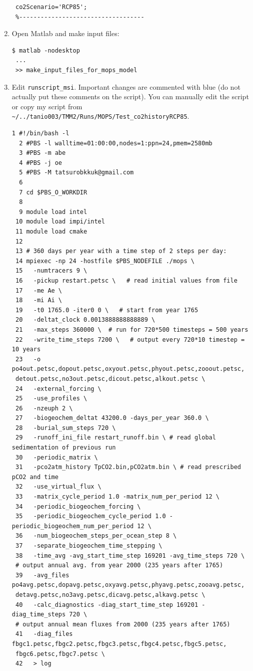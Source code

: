 \documentclass[a4paper]{article}
\begin{document}
\begin{enumerate}
\begin{lstlisting}[frame=single,basicstyle=\scriptsize,commentstyle=\color{blue}]
 % Available options: 'historical', 'RCP3PD', 'RCP45', 'RCP6' and 'RCP85'
 co2Scenario='RCP85';
 %-----------------------------------
\end{lstlisting}

\item Open Matlab and make input files:
\begin{lstlisting}[style=DOS]
 $ matlab -nodesktop
 ...
 >> make_input_files_for_mops_model
\end{lstlisting}

\item Edit \verb|runscript_msi|. Important changes are commented with blue (do not actually put these comments on the script). You can manually edit the script or copy my script from \\ \verb|~/../tanio003/TMM2/Runs/MOPS/Test_co2historyRCP85|.
\lstset{language=sh} 
\begin{lstlisting}[frame=single,basicstyle=\scriptsize,commentstyle=\color{blue}]
  1 #!/bin/bash -l
  2 #PBS -l walltime=01:00:00,nodes=1:ppn=24,pmem=2580mb
  3 #PBS -m abe
  4 #PBS -j oe
  5 #PBS -M tatsurobkkuk@gmail.com
  6
  7 cd $PBS_O_WORKDIR
  8
  9 module load intel
 10 module load impi/intel
 11 module load cmake
 12
 13 # 360 days per year with a time step of 2 steps per day:
 14 mpiexec -np 24 -hostfile $PBS_NODEFILE ./mops \
 15   -numtracers 9 \
 16   -pickup restart.petsc \   # read initial values from file
 17   -me Ae \
 18   -mi Ai \
 19   -t0 1765.0 -iter0 0 \   # start from year 1765
 20   -deltat_clock 0.0013888888888889 \   
 21   -max_steps 360000 \  # run for 720*500 timesteps = 500 years
 22   -write_time_steps 7200 \   # output every 720*10 timestep = 10 years
 23   -o po4out.petsc,dopout.petsc,oxyout.petsc,phyout.petsc,zooout.petsc,
 detout.petsc,no3out.petsc,dicout.petsc,alkout.petsc \
 24   -external_forcing \
 25   -use_profiles \
 26   -nzeuph 2 \
 27   -biogeochem_deltat 43200.0 -days_per_year 360.0 \
 28   -burial_sum_steps 720 \
 29   -runoff_ini_file restart_runoff.bin \ # read global sedimentation of previous run
 30   -periodic_matrix \
 31   -pco2atm_history TpCO2.bin,pCO2atm.bin \ # read prescribed pCO2 and time
 32   -use_virtual_flux \
 33   -matrix_cycle_period 1.0 -matrix_num_per_period 12 \
 34   -periodic_biogeochem_forcing \
 35   -periodic_biogeochem_cycle_period 1.0 -periodic_biogeochem_num_per_period 12 \
 36   -num_biogeochem_steps_per_ocean_step 8 \
 37   -separate_biogeochem_time_stepping \
 38   -time_avg -avg_start_time_step 169201 -avg_time_steps 720 \ 
 # output annual avg. from year 2000 (235 years after 1765)
 39   -avg_files po4avg.petsc,dopavg.petsc,oxyavg.petsc,phyavg.petsc,zooavg.petsc,
 detavg.petsc,no3avg.petsc,dicavg.petsc,alkavg.petsc \
 40   -calc_diagnostics -diag_start_time_step 169201 -diag_time_steps 720 \ 
 # output annual mean fluxes from 2000 (235 years after 1765)
 41   -diag_files fbgc1.petsc,fbgc2.petsc,fbgc3.petsc,fbgc4.petsc,fbgc5.petsc,
 fbgc6.petsc,fbgc7.petsc \
 42   > log
\end{lstlisting}


\end{enumerate}
\end{document}
